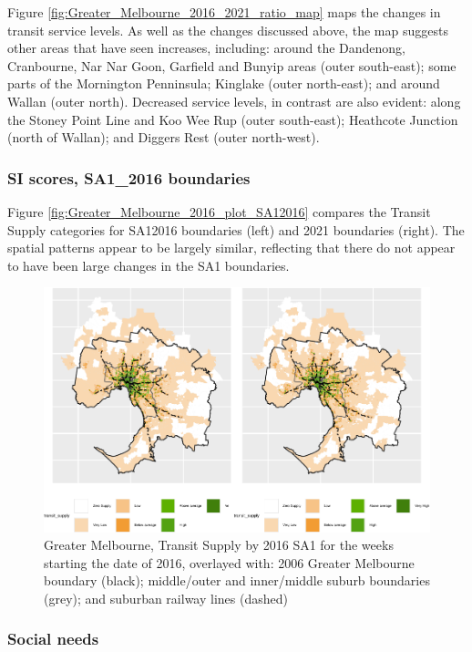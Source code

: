 \documentclass[preprint, 3p,
authoryear]{elsarticle} %
\begin{document}
Figure \ref{fig:Greater_Melbourne_2016_2021_ratio_map} maps the changes
in transit service levels. As well as the changes discussed above, the
map suggests other areas that have seen increases, including: around the
Dandenong, Cranbourne, Nar Nar Goon, Garfield and Bunyip areas (outer
south-east); some parts of the Mornington Penninsula; Kinglake (outer
north-east); and around Wallan (outer north). Decreased service levels,
in contrast are also evident: along the Stoney Point Line and Koo Wee
Rup (outer south-east); Heathcote Junction (north of Wallan); and
Diggers Rest (outer north-west).

\subsubsection{SI scores, SA1\_2016
boundaries}\label{si-scores-sa1_2016-boundaries}

Figure \ref{fig:Greater_Melbourne_2016_plot_SA12016} compares the
Transit Supply categories for SA12016 boundaries (left) and 2021
boundaries (right). The spatial patterns appear to be largely similar,
reflecting that there do not appear to have been large changes in the
SA1 boundaries.

\begin{figure}
\centering
\includegraphics{Leveraging_GTFS_to_assess_transit_supply_Transport_Geography_files/figure-latex/Greater_Melbourne_2016_plot_SA12016-1.pdf}
\caption{Greater Melbourne, Transit Supply by 2016 SA1 for the weeks
starting the date of 2016, overlayed with: 2006 Greater Melbourne
boundary (black); middle/outer and inner/middle suburb boundaries
(grey); and suburban railway lines (dashed)}
\end{figure}

\subsubsection{Social needs}\label{social-needs-1}
\end{document}
